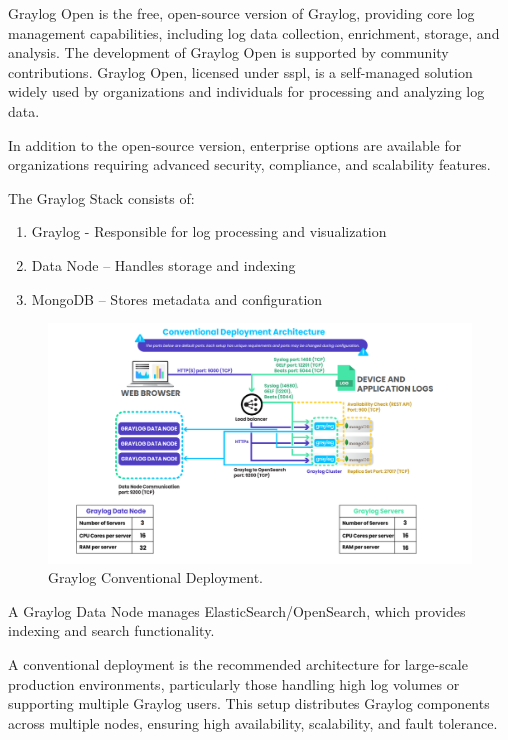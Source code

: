 \documentclass[../main.tex]{subfiles}
\begin{document}
Graylog Open is the free, open-source version of Graylog, providing core log management capabilities, including log data collection, enrichment, storage, and analysis. The development of Graylog Open is supported by community contributions. Graylog Open, licensed under \gls{sspl}, is a self-managed solution widely used by organizations and individuals for processing and analyzing log data. 

In addition to the open-source version, enterprise options are available for organizations requiring advanced security, compliance, and scalability features.

The Graylog Stack consists of:  

\begin{enumerate}
    \item{Graylog} - Responsible for log processing and visualization 
    \item{Data Node} – Handles storage and indexing
    \item{MongoDB} – Stores metadata and configuration
\end{enumerate} 

\begin{figure}[H]
    \centering
    \includegraphics[scale=0.36]{img/3-background/graylog/deployment.png}
    \caption{Graylog Conventional Deployment. }
    \label{fig:graylog_deployment}
\end{figure}


A Graylog Data Node manages ElasticSearch/OpenSearch, which provides indexing and search functionality.  

A conventional deployment is the recommended architecture for large-scale production environments, particularly those handling high log volumes or supporting multiple Graylog users. This setup distributes Graylog components across multiple nodes, ensuring high availability, scalability, and fault tolerance.  
\end{document}
